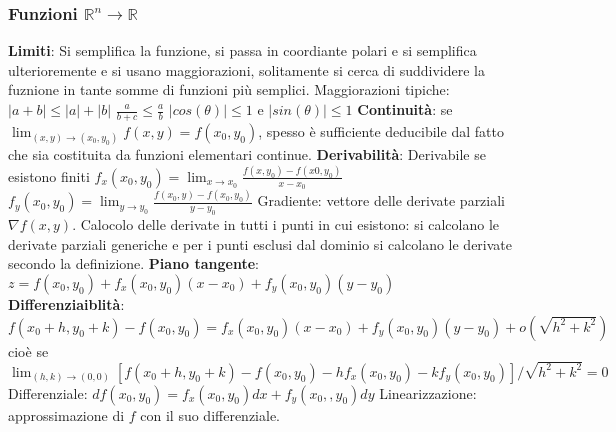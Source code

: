 \documentclass[fontsize=8pt]{scrartcl}
\begin{document}
\begin{multicols*}{4}
\subsubsection*{Funzioni $\mathbb{R}^n \rightarrow  \mathbb{R}$}
\textbf{Limiti}:\newline
Si semplifica la funzione, si passa in coordiante polari e si semplifica ulterioremente e si usano maggiorazioni, solitamente si cerca di suddividere la fuznione in tante somme di funzioni più semplici.
Maggiorazioni tipiche:\newline
$|a+b| \leq |a| + |b|$\newline
$\frac{a}{b+c} \leq \frac{a}{b}$\newline
$|cos(\theta)| \leq 1$ e $|sin(\theta)| \leq 1$\newline
\textbf{Continuità}:\newline
se $\lim_{(x,y)\rightarrow (x_0, y_0)} f(x,y) = f(x_0,y_0)$, spesso è sufficiente deducibile dal fatto che sia costituita da funzioni elementari continue.\newline
\textbf{Derivabilità}:\newline
Derivabile se esistono finiti\newline
$f_x(x_0,y_0) = \lim_{x\rightarrow x_0} \frac{f(x,y_0) - f(x0,y_0)}{x-x_0}$\newline
$f_y(x_0,y_0) = \lim_{y\rightarrow y_0} \frac{f(x_0,y) - f(x_0,y_0)}{y-y_0}$\newline
Gradiente: vettore delle derivate parziali $\nabla f(x,y)$.\newline
Calocolo delle derivate in tutti i punti in cui esistono: si calcolano le derivate parziali generiche e per i punti esclusi dal dominio si calcolano le derivate secondo la definizione.
\textbf{Piano tangente}:\newline
$z = f(x_0,y_0) + f_x(x_0,y_0)(x-x_0) + f_y (x_0,y_0)(y-y_0)$\newline
\textbf{Differenziaiblità}:\newline
$f(x_0 + h, y_0 + k) - f(x_0,y_0) = f_x(x_0,y_0) (x-x_0) + f_y(x_0,y_0)(y-y_0) + o(\sqrt{h^2 + k^2})$\newline
cioè se \newline
$\lim_{(h,k)\rightarrow (0,0)} [ f(x_0 + h, y_0 +k) - f(x_0,y_0) - h f_x(x_0,y_0) - k f_y(x_0,y_0) ] / \sqrt{h^2+k^2} = 0$\newline
Differenziale: $df(x_0,y_0) = f_x(x_0,y_0) dx + f_y(x_0,,y_0)dy$\newline
Linearizzazione: approssimazione di $f$ con il suo differenziale.\newline

\end{multicols*}
\end{document}
